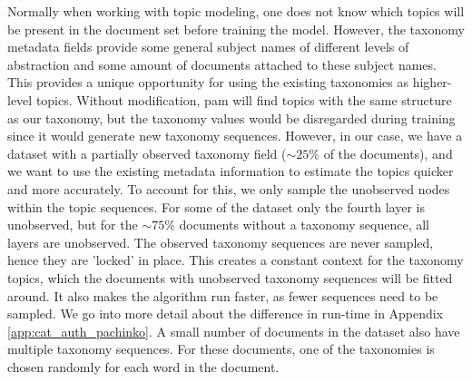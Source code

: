 

Normally when working with topic modeling, one does not know which topics will be present in the document set before training the model.
However, the taxonomy metadata fields provide some general subject names of different levels of abstraction and some amount of documents attached to these subject names.
This provides a unique opportunity for using the existing taxonomies as higher-level topics.
Without modification, \gls{pam} will find topics with the same structure as our taxonomy, but the taxonomy values would be disregarded during training since it would generate new taxonomy sequences.
However, in our case, we have a dataset with a partially observed taxonomy field (${\sim}25\%$ of the documents), and we want to use the existing metadata information to estimate the topics quicker and more accurately.
To account for this, we only sample the unobserved nodes within the topic sequences.
For some of the dataset only the fourth layer is unobserved, but for the ${\sim}75\%$ documents without a taxonomy sequence, all layers are unobserved.
The observed taxonomy sequences are never sampled, hence they are 'locked' in place.
This creates a constant context for the taxonomy topics, which the documents with unobserved taxonomy sequences will be fitted around.
It also makes the algorithm run faster, as fewer sequences need to be sampled.
We go into more detail about the difference in run-time in Appendix \autoref{app:cat_auth_pachinko}.
A small number of documents in the dataset also have multiple taxonomy sequences.
For these documents, one of the taxonomies is chosen randomly for each word in the document.
